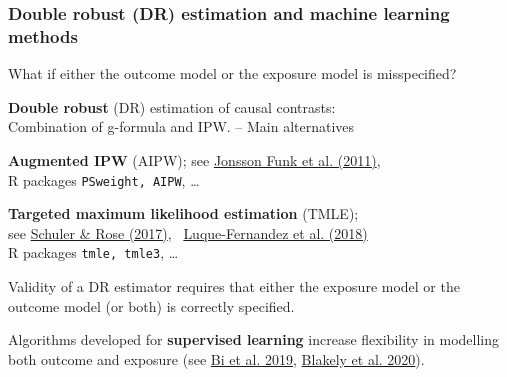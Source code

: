 \documentclass[12pt,dvipsnames,t,aspectratio=169, handout%
]{beamer}
\begin{document}
\begin{frame}
\frametitle{Double robust (DR) estimation and machine learning methods}
\bi
\item
What if either the outcome model or the exposure model is misspecified?
\pause
\medskip
\item
{\bf Double robust} (DR) estimation 
of causal contrasts: \\
Combination of g-formula and IPW.
\pause 
-- Main alternatives
\bi
{\normalsize
\item[--]
 {\bf Augmented IPW} (AIPW); {\small see \href{https://doi.org/10.1093/aje/kwq439}{\color{blue}Jonsson Funk et al. (2011)}},\\
R packages {\tt PSweight, AIPW}, \dots
\medskip
\item[--] {\bf Targeted maximum likelihood estimation} (TMLE); \\ 
 {\small see \href{https://doi.org/10.1093/aje/kww165}{\color{blue}Schuler \& Rose (2017)}, \
  \href{https://doi.org/10.1002/sim.7628}{\color{blue}Luque-Fernandez et al. (2018)}} \\
	R packages {\tt tmle, tmle3}, \dots 
}
\ei
\pause
Validity of a DR estimator requires that either the exposure model 
or the outcome model (or both) is correctly specified.
\pause
\item Algorithms developed for {\bf supervised learning} 
increase flexibility in modelling both outcome and exposure 
{\small (see \href{https://doi.org/10.1093/aje/kwz189}{\color{blue}Bi et al. 2019}, 
\href{https://doi.org/10.1093/ije/dyz132}{\color{blue}Blakely et al. 2020})}.
\ei 
\end{frame}
\end{document}
